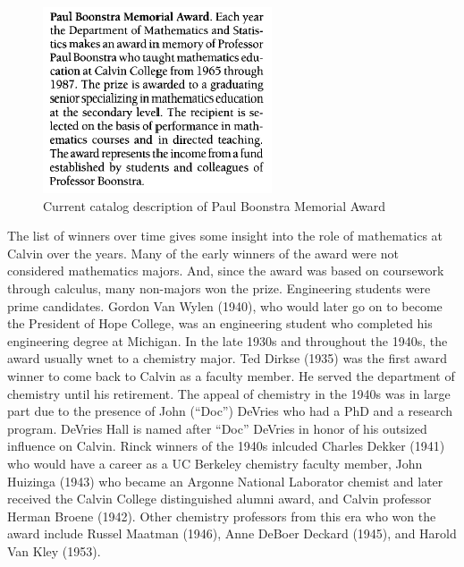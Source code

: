 \documentclass[
]{book}
\begin{document}
\begin{figure}

{\centering \includegraphics[width=0.6\linewidth]{images/Boonstra} 

}

\caption{Current catalog description of Paul Boonstra Memorial Award}\label{fig:Boonstra}
\end{figure}

The list of winners over time gives some insight into the role of mathematics at Calvin over the years. Many of the early winners of the award were not considered mathematics majors. And, since the award was based on coursework through calculus, many non-majors won the prize. Engineering students were prime candidates. Gordon Van Wylen (1940), who would later go on to become the President of Hope College, was an engineering student who completed his engineering degree at Michigan. In the late 1930s and throughout the 1940s, the award usually wnet to a chemistry major. Ted Dirkse (1935) was the first award winner to come back to Calvin as a faculty member. He served the department of chemistry until his retirement. The appeal of chemistry in the 1940s was in large part due to the presence of John (``Doc'') DeVries who had a PhD and a research program. DeVries Hall is named after ``Doc'' DeVries in honor of his outsized influence on Calvin. Rinck winners of the 1940s inlcuded Charles Dekker (1941) who would have a career as a UC Berkeley chemistry faculty member, John Huizinga (1943) who became an Argonne National Laborator chemist and later received the Calvin College distinguished alumni award, and Calvin professor Herman Broene (1942). Other chemistry professors from this era who won the award include Russel Maatman (1946), Anne DeBoer Deckard (1945), and Harold Van Kley (1953).
\end{document}
